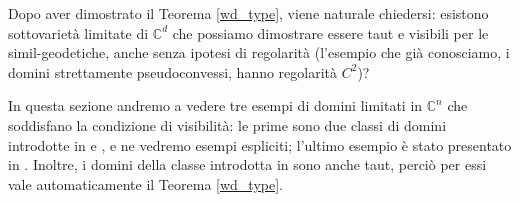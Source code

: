 Dopo aver dimostrato il Teorema \ref{wd_type}, viene naturale chiedersi: esistono sottovarietà limitate di $\mathbb{C}^d$ che possiamo dimostrare essere taut e visibili per le simil-geodetiche, anche senza ipotesi di regolarità (l'esempio che già conosciamo, i domini strettamente pseudoconvessi, hanno regolarità $C^2$)?

In questa sezione andremo a vedere tre esempi di domini limitati in $\mathbb{C}^n$ che soddisfano la condizione di visibilità: le prime sono due classi di domini introdotte in \cite{BZ1} e \cite{BM}, e ne vedremo esempi espliciti; l'ultimo esempio è stato presentato in \cite{CMS}. Inoltre, i domini della classe introdotta in \cite{BM} sono anche taut, perciò per essi vale automaticamente il Teorema \ref{wd_type}.